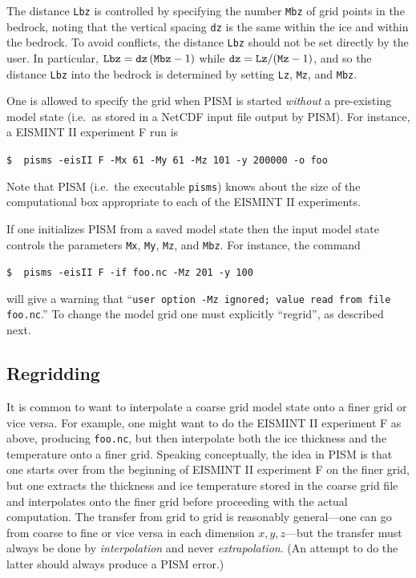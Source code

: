 \documentclass[11pt,final]{amsart}
\renewcommand{\t}[1]{\texttt{#1}}
\begin{document}
The distance \t{Lbz} is controlled by specifying the number \verb|Mbz| of grid points in the bedrock, noting that the vertical spacing \t{dz} is the same within the ice and within the bedrock.  To avoid conflicts, the distance \t{Lbz} should not be set directly by the user.  In particular, $\text{\t{Lbz}}=\text{\t{dz}}\,(\text{\t{Mbz}}-1)$ while $\text{\t{dz}} = \text{\t{Lz}} / (\text{\t{Mz}}-1)$, and so the distance \t{Lbz} into the bedrock is determined by setting \t{Lz}, \t{Mz}, and \t{Mbz}.

One is allowed to specify the grid when PISM is started \emph{without} a pre-existing model state (i.e.~as stored in a NetCDF input file output by PISM).  For instance, a EISMINT II experiment F \cite{EISMINT00} run is

\verb|$  pisms -eisII F -Mx 61 -My 61 -Mz 101 -y 200000 -o foo|

\noindent Note that PISM (i.e.~the executable \verb|pisms|) knows about the size of the computational box appropriate to each of the EISMINT II experiments.

If one initializes PISM from a saved model state then the input model state controls the parameters \t{Mx}, \t{My}, \t{Mz}, and \t{Mbz}.  For instance, the command

\verb|$  pisms -eisII F -if foo.nc -Mz 201 -y 100|

\noindent will give a warning that ``\verb|user option -Mz ignored; value read from file foo.nc|.''  To change the model grid one must explicitly ``regrid'', as described next.

\subsection{Regridding}  It is common to want to interpolate a coarse grid model state onto a finer grid or vice versa.  For example, one might want to do the EISMINT II experiment F as above, producing \verb|foo.nc|, but then interpolate both the ice thickness and the temperature onto a finer grid.  Speaking conceptually, the idea in PISM is that one starts over from the beginning of EISMINT II experiment F on the finer grid, but one extracts the thickness and ice temperature stored in the coarse grid file and interpolates onto the finer grid before proceeding with the actual computation.  The transfer from grid to grid is reasonably general---one can go from coarse to fine or vice versa in each dimension $x,y,z$---but the transfer must always be done by \emph{interpolation} and never \emph{extrapolation}.  (An attempt to do the latter should always produce a PISM error.)
\end{document}

